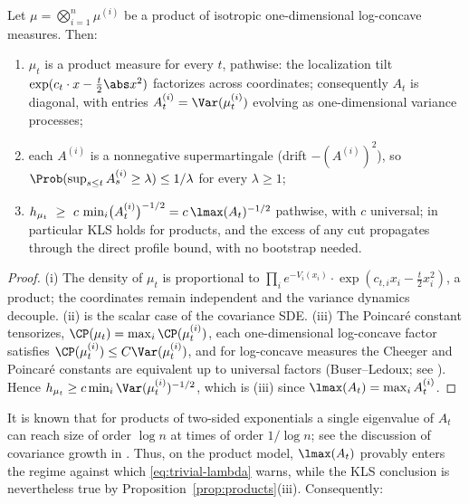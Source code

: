 \documentclass[../../main.tex]{subfiles}
\begin{document}
\begin{proposition}
\label{prop:products}
Let $\mu=\bigotimes_{i=1}^n\mu^{(i)}$ be a product of isotropic one-dimensional log-concave
measures. Then:
\begin{enumerate}[label=(\roman*),leftmargin=2.2em]
\item $\mu_t$ is a product measure for every $t$, pathwise: the localization tilt
$\exp(c_t\cdot x-\tfrac t2\abs x^2)$ factorizes across coordinates; consequently $A_t$ is
diagonal, with entries $A_t^{(i)}=\Var(\mu_t^{(i)})$ evolving as one-dimensional variance
processes;
\item each $A^{(i)}$ is a nonnegative supermartingale (drift $-(A^{(i)})^2$), so
$\Prob(\sup_{s\le t}A_s^{(i)}\ge\lambda)\le1/\lambda$ for every $\lambda\ge1$;
\item $h_{\mu_t}\ \ge\ c\,\min_i\bigl(A_t^{(i)}\bigr)^{-1/2}
=c\,\lmax(A_t)^{-1/2}$
pathwise, with $c$ universal; in particular KLS holds for products, and the excess of any cut
propagates through the direct profile bound, with no bootstrap needed.
\end{enumerate}
\end{proposition}

\begin{proof}
(i) The density of $\mu_t$ is proportional to
$\prod_ie^{-V_i(x_i)}\cdot\exp(c_{t,i}x_i-\tfrac t2x_i^2)$, a product; the coordinates remain
independent and the variance dynamics decouple. (ii) is the scalar case of the covariance SDE.
(iii) The Poincar\'e constant tensorizes, $\CP(\mu_t)=\max_i\CP(\mu_t^{(i)})$, each
one-dimensional log-concave factor satisfies $\CP(\mu_t^{(i)})\le C\Var(\mu_t^{(i)})$, and for
log-concave measures the Cheeger and Poincar\'e constants are equivalent up to universal
factors (Buser--Ledoux; see \cite{BakryGentilLedoux2014,LeeVempala2018}). Hence
$h_{\mu_t}\ge c\min_i\Var(\mu_t^{(i)})^{-1/2}$, which is (iii) since
$\lmax(A_t)=\max_iA_t^{(i)}$.
\end{proof}

\begin{remark}
\label{rem:product-stress}
It is known that for products of two-sided exponentials a single eigenvalue of $A_t$ can reach
size of order $\log n$ at times of order $1/\log n$; see the discussion of covariance growth in
\cite{Chen2021,KlartagLehec2022Polylog}. Thus, on the product model, $\lmax(A_t)$ provably
enters the regime against which \eqref{eq:trivial-lambda} warns, while the KLS conclusion is
nevertheless true by Proposition~\ref{prop:products}(iii). Consequently:
\end{remark}
\end{document}
